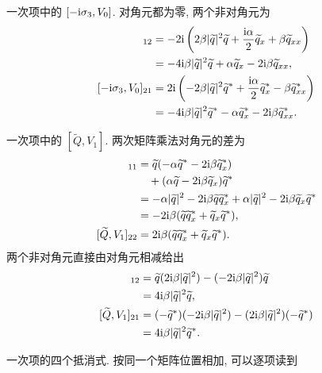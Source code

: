 \par\smallskip\noindent 一次项中的 $[-\mathrm{i}\sigma_3,V_0]$.\quad
对角元都为零, 两个非对角元为
\begin{align*}
[-\ii\sg,V_0]_{12}
&=-2\ii\left(2\beta|\widetilde q|^2\widetilde q
+\dfrac{\ii\alpha}{2}\widetilde q_x
+\beta\widetilde q_{xx}\right)\\
&=-4\ii\beta|\widetilde q|^2\widetilde q
+\alpha\widetilde q_x-2\ii\beta\widetilde q_{xx},\\
[-\ii\sg,V_0]_{21}
&=2\ii\left(-2\beta|\widetilde q|^2\conj{\widetilde q}
+\dfrac{\ii\alpha}{2}\conj{\widetilde q_x}
-\beta\conj{\widetilde q_{xx}}\right)\\
&=-4\ii\beta|\widetilde q|^2\conj{\widetilde q}
-\alpha\conj{\widetilde q_x}
-2\ii\beta\conj{\widetilde q_{xx}}.
\end{align*}
\par\smallskip\noindent 一次项中的 $[\widetilde Q,V_1]$.\quad
两次矩阵乘法对角元的差为
\begin{align*}
[\widetilde Q,V_1]_{11}
&=\widetilde q(-\alpha\conj{\widetilde q}
-2\ii\beta\conj{\widetilde q_x})\\
&\quad+(\alpha\widetilde q-2\ii\beta\widetilde q_x)
\conj{\widetilde q}\\
&=-\alpha|\widetilde q|^2
-2\ii\beta\widetilde q\conj{\widetilde q_x}
+\alpha|\widetilde q|^2
-2\ii\beta\widetilde q_x\conj{\widetilde q}\\
&=-2\ii\beta
(\widetilde q\conj{\widetilde q_x}
+\widetilde q_x\conj{\widetilde q}),\\
[\widetilde Q,V_1]_{22}
&=2\ii\beta
(\widetilde q\conj{\widetilde q_x}
+\widetilde q_x\conj{\widetilde q}).
\end{align*}
两个非对角元直接由对角元相减给出
\begin{align*}
[\widetilde Q,V_1]_{12}
&=\widetilde q(2\ii\beta|\widetilde q|^2)
-(-2\ii\beta|\widetilde q|^2)\widetilde q\\
&=4\ii\beta|\widetilde q|^2\widetilde q,\\
[\widetilde Q,V_1]_{21}
&=(-\conj{\widetilde q})(-2\ii\beta|\widetilde q|^2)
-(2\ii\beta|\widetilde q|^2)(-\conj{\widetilde q})\\
&=4\ii\beta|\widetilde q|^2\conj{\widetilde q}.
\end{align*}
\par\smallskip\noindent 一次项的四个抵消式.\quad
按同一个矩阵位置相加, 可以逐项读到
